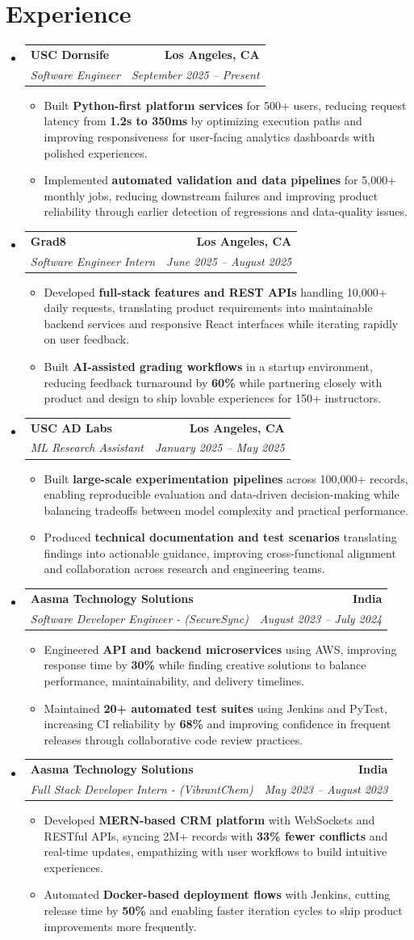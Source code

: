 \documentclass[letterpaper,10pt]{article}
\makeatletter
\newcommand{\resumeItem}[1]{\item\small{{#1 \vspace{-2pt}}}}
\newcommand{\resumeSubheading}[4]{\vspace{-1pt}\item\begin{tabular*}{1.0\textwidth}[t]{l@{\extracolsep{\fill}}r}\textbf{#1} & \textbf{\small #2} \\\textit{\small#3} & \textit{\small #4} \\\end{tabular*}\vspace{-2pt}}
\newcommand{\resumeSubHeadingListStart}{\begin{itemize}[leftmargin=0.0in, label={}]}
\newcommand{\resumeSubHeadingListEnd}{\end{itemize}}
\newcommand{\resumeItemListStart}{\begin{itemize}[leftmargin=0.15in,label=\textbullet,itemsep=2pt,topsep=0pt,parsep=0pt,partopsep=0pt]}
\newcommand{\resumeItemListEnd}{\end{itemize}\vspace{-4pt}}
\makeatother
\begin{document}
\section{Experience}
\resumeSubHeadingListStart
\resumeSubheading{USC Dornsife}{Los Angeles, CA}{Software Engineer}{September 2025 -- Present}
\resumeItemListStart
\resumeItem{Built \textbf{Python-first platform services} for 500+ users, reducing request latency from \textbf{1.2s to 350ms} by optimizing execution paths and improving responsiveness for user-facing analytics dashboards with polished experiences.}
\resumeItem{Implemented \textbf{automated validation and data pipelines} for 5,000+ monthly jobs, reducing downstream failures and improving product reliability through earlier detection of regressions and data-quality issues.}
\resumeItemListEnd
\resumeSubheading{Grad8}{Los Angeles, CA}{Software Engineer Intern}{June 2025 -- August 2025}
\resumeItemListStart
\resumeItem{Developed \textbf{full-stack features and REST APIs} handling 10,000+ daily requests, translating product requirements into maintainable backend services and responsive React interfaces while iterating rapidly on user feedback.}
\resumeItem{Built \textbf{AI-assisted grading workflows} in a startup environment, reducing feedback turnaround by \textbf{60\%} while partnering closely with product and design to ship lovable experiences for 150+ instructors.}
\resumeItemListEnd
\resumeSubheading{USC AD Labs}{Los Angeles, CA}{ML Research Assistant}{January 2025 -- May 2025}
\resumeItemListStart
\resumeItem{Built \textbf{large-scale experimentation pipelines} across 100,000+ records, enabling reproducible evaluation and data-driven decision-making while balancing tradeoffs between model complexity and practical performance.}
\resumeItem{Produced \textbf{technical documentation and test scenarios} translating findings into actionable guidance, improving cross-functional alignment and collaboration across research and engineering teams.}
\resumeItemListEnd
\resumeSubheading{Aasma Technology Solutions}{India}{Software Developer Engineer - (SecureSync)}{August 2023 -- July 2024}
\resumeItemListStart
\resumeItem{Engineered \textbf{API and backend microservices} using AWS, improving response time by \textbf{30\%} while finding creative solutions to balance performance, maintainability, and delivery timelines.}
\resumeItem{Maintained \textbf{20+ automated test suites} using Jenkins and PyTest, increasing CI reliability by \textbf{68\%} and improving confidence in frequent releases through collaborative code review practices.}
\resumeItemListEnd
\resumeSubheading{Aasma Technology Solutions}{India}{Full Stack Developer Intern - (VibrantChem)}{May 2023 -- August 2023}
\resumeItemListStart
\resumeItem{Developed \textbf{MERN-based CRM platform} with WebSockets and RESTful APIs, syncing 2M+ records with \textbf{33\% fewer conflicts} and real-time updates, empathizing with user workflows to build intuitive experiences.}
\resumeItem{Automated \textbf{Docker-based deployment flows} with Jenkins, cutting release time by \textbf{50\%} and enabling faster iteration cycles to ship product improvements more frequently.}
\resumeItemListEnd
\resumeSubHeadingListEnd
\vspace{-14pt}
\end{document}
